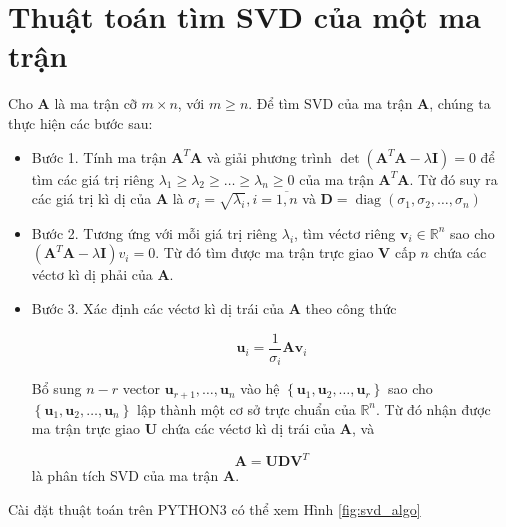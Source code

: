 \documentclass[12pt,a4paper,oneside]{report}
\numberwithin{equation}{section}
\begin{document}
\section{Thuật toán tìm SVD của một ma trận}
Cho $\mathbf{A}$ là ma trận cỡ $m \times n$, với $m \geq n$. Để tìm $\mathrm{SVD}$ của ma trận $\mathbf{A}$, chúng ta thực hiện các bước sau:
\begin{itemize}

 \item Bước 1. Tính ma trận $\mathbf{A}^{T} \mathbf{A}$ và giải phương trình $\operatorname{det}\left(\mathbf{A}^{T} \mathbf{A}-\lambda \mathbf{I}\right)=0$ để tìm các giá trị riêng $\lambda_{1} \geq \lambda_{2} \geq \ldots \geq \lambda_{n} \geq 0$ của ma trận $\mathbf{A}^{T} \mathbf{A}$. Từ đó suy ra các giá trị kì dị của $\mathbf{A}$ là $\sigma_{i}=\sqrt{\lambda_{i}}, i=\overline{1, n}$ và $\mathbf{D}=\operatorname{diag}\left(\sigma_{1}, \sigma_{2}, \ldots, \sigma_{n}\right)$

\item Bước 2. Tương ứng với mỗi giá trị riêng $\lambda_{i}$, tìm véctơ riêng $\mathbf{v}_{i} \in \mathbb{R}^{n}$ sao cho $\left(\mathbf{A}^{T} \mathbf{A}-\lambda \mathbf{I}\right) v_{i}=0$. Từ đó tìm được ma trận trực giao $\mathbf{V}$ cấp $n$ chứa các véctơ kì dị phải của $\mathbf{A}$.

\item Bước 3. Xác định các véctơ kì dị trái của $\mathbf{A}$ theo công thức

$$
\mathbf{u}_{i}=\frac{1}{\sigma_{i}} \mathbf{A} \mathbf{v}_{i}
$$

Bổ sung $n-r$ vector $\mathbf{u}_{r+1}, \ldots, \mathbf{u}_{n}$ vào hệ $\left\{\mathbf{u}_{1}, \mathbf{u}_{2}, \ldots, \mathbf{u}_{r}\right\}$ sao cho $\left\{\mathbf{u}_{1},\mathbf{u}_{2}, \ldots, \mathbf{u}_{n}\right\}$ lập thành một cơ sở trực chuẩn của $\mathbb{R}^{n}$. Từ đó nhận được ma trận trực giao $\mathbf{U}$ chứa các véctơ kì dị trái của $\mathbf{A}$, và

$$
\mathbf{A}=\mathbf{U D V}^{T}
$$
là phân tích SVD của ma trận $\mathbf{A}$.
\end{itemize}

Cài đặt thuật toán trên PYTHON3 có thể xem Hình \ref{fig:svd_algo}
\newpage
\end{document}
